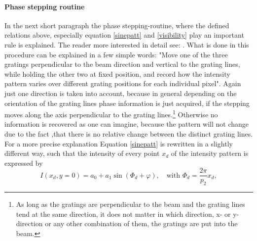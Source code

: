 \paragraph{Phase stepping routine} In the next short paragraph the phase stepping-routine, where the defined relations above, especially equation \ref{sinepatt} and \ref{visibility} play an important rule is explained. The reader more interested in detail see: \citep{Creath1988,Momose2005,Lewis2002,Bech2009,Pfeiffer2008}. What is done in this procedure can be explained in a few simple words: "Move one of the three gratings perpendicular to the beam direction and vertical to the grating lines, while holding the other two at fixed position, and record how the intensity pattern varies over different grating positions for each individual pixel". Again just one direction is taken into account, because in general depending on the orientation of the grating lines phase information is just acquired, if the stepping moves along the axis perpendicular to the grating lines.\footnote{As long as the gratings are perpendicular to the beam and the grating lines tend at the same direction, it does not matter in which direction, x- or y-direction or any other combination of them, the gratings are put into the beam.} Otherwise no information is recovered as one can imagine, because the pattern will not change due to the fact ,that there is no relative change between the distinct grating lines. For a more precise explanation Equation \ref{sinepatt} is rewritten in a slightly different way, such that the intensity of every point $x_{d}$ of the intensity pattern is expressed by 
\begin{equation}
I(x_{d},y = 0) = a_{0} + a_{1}  \sin(\Phi_{d}+ \varphi), \quad \text{with }  \Phi_{d}  = \frac{2\pi}{p_{2}}x_{d},
\end{equation} 
